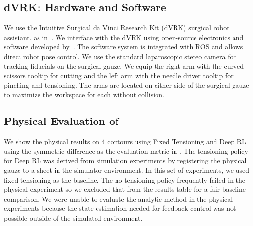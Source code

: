
\subsection*{dVRK: Hardware and Software}
We use the Intuitive Surgical da Vinci Research Kit (dVRK) surgical robot assistant, as in~\cite{murali2015learning,sen2015automating,garg2016gpas}. We interface with the dVRK using open-source electronics and software developed by~\cite{Kazanzides2014}. The software system is integrated with ROS and allows direct robot pose control.
We use the standard laparoscopic stereo camera for tracking fiducials on the surgical gauze. We equip the right arm with the curved scissors tooltip for cutting and the left arm with the needle driver tooltip for pinching and tensioning. The arms are located on either side of the surgical gauze to maximize the workspace for each without collision.
\subsection*{Physical Evaluation of \tpsalgo} 
We show the physical results on 4 contours using Fixed Tensioning and Deep RL using the symmetric difference as the evaluation metric in . The tensioning policy for Deep RL was derived from simulation experiments by registering the physical gauze to a sheet in the simulator environment. 
In this set of experiments, we used fixed tensioning as the baseline.
The no tensioning policy frequently failed in the physical experiment so we excluded that from the results table for a fair baseline comparison.
We were unable to evaluate the analytic method in the physical experiments because the state-estimation needed for feedback control was not possible outside of the simulated environment.

